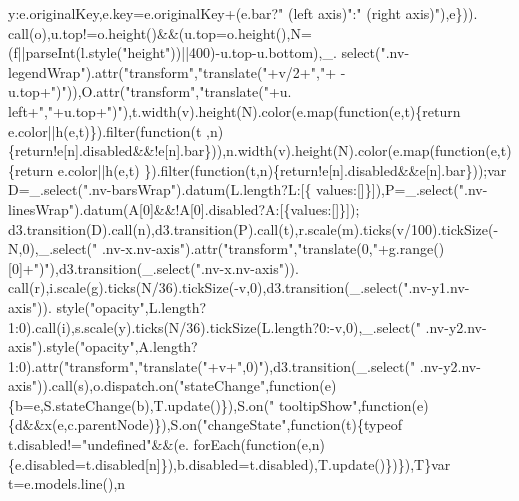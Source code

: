 \begin{DoxyCode}
{      y:e.originalKey,e.key=e.originalKey+(e.bar?\textcolor{stringliteral}{" (left axis)"}:\textcolor{stringliteral}{" (right axis)"}),e\})).
      call(o),u.top!=o.height()&&(u.top=o.height(),N=(f||parseInt(l.style(\textcolor{stringliteral}{"height"}))||400)-u.top-u.bottom),\_.
      select(\textcolor{stringliteral}{".nv-legendWrap"}).attr(\textcolor{stringliteral}{"transform"},\textcolor{stringliteral}{"translate("}+v/2+\textcolor{stringliteral}{","}+ -u.top+\textcolor{stringliteral}{")"})),O.attr(\textcolor{stringliteral}{"transform"},\textcolor{stringliteral}{"translate("}+u.
      left+\textcolor{stringliteral}{","}+u.top+\textcolor{stringliteral}{")"}),t.width(v).height(N).color(e.map(\textcolor{keyword}{function}(e,t)\{return e.color||h(e,t)\}).filter(\textcolor{keyword}{function}(t
      ,n)\{\textcolor{keywordflow}{return}!e[n].disabled&&!e[n].bar\})),n.width(v).height(N).color(e.map(\textcolor{keyword}{function}(e,t)\{return e.color||h(e,t)
      \}).filter(\textcolor{keyword}{function}(t,n)\{\textcolor{keywordflow}{return}!e[n].disabled&&e[n].bar\}));var D=\_.select(\textcolor{stringliteral}{".nv-barsWrap"}).datum(L.length?L:[\{
      values:[]\}]),P=\_.select(\textcolor{stringliteral}{".nv-linesWrap"}).datum(A[0]&&!A[0].disabled?A:[\{values:[]\}]);
      d3.transition(D).call(n),d3.transition(P).call(t),r.scale(m).ticks(v/100).tickSize(-N,0),\_.select(\textcolor{stringliteral}{"
      .nv-x.nv-axis"}).attr(\textcolor{stringliteral}{"transform"},\textcolor{stringliteral}{"translate(0,"}+g.range()[0]+\textcolor{stringliteral}{")"}),d3.transition(\_.select(\textcolor{stringliteral}{".nv-x.nv-axis"})).
      call(r),i.scale(g).ticks(N/36).tickSize(-v,0),d3.transition(\_.select(\textcolor{stringliteral}{".nv-y1.nv-axis"})).
      style(\textcolor{stringliteral}{"opacity"},L.length?1:0).call(i),s.scale(y).ticks(N/36).tickSize(L.length?0:-v,0),\_.select(\textcolor{stringliteral}{"
      .nv-y2.nv-axis"}).style(\textcolor{stringliteral}{"opacity"},A.length?1:0).attr(\textcolor{stringliteral}{"transform"},\textcolor{stringliteral}{"translate("}+v+\textcolor{stringliteral}{",0)"}),d3.transition(\_.select(\textcolor{stringliteral}{"
      .nv-y2.nv-axis"})).call(s),o.dispatch.on(\textcolor{stringliteral}{"stateChange"},\textcolor{keyword}{function}(e)\{b=e,S.stateChange(b),T.update()\}),S.on(\textcolor{stringliteral}{"
      tooltipShow"},\textcolor{keyword}{function}(e)\{d&&x(e,c.parentNode)\}),S.on(\textcolor{stringliteral}{"changeState"},\textcolor{keyword}{function}(t)\{typeof t.disabled!=\textcolor{stringliteral}{"undefined"}&&(e.
      forEach(\textcolor{keyword}{function}(e,n)\{e.disabled=t.disabled[n]\}),b.disabled=t.disabled),T.update()\})\}),T\}var t=e.models.line(),n
}
\end{DoxyCode}
